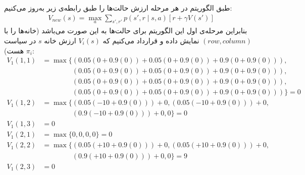 \question{}

\begin{ابجد}
\item طبق الگوریتم  در هر مرحله ارزش حالت‌ها را طبق رابطه‌ی زیر به‌روز می‌کنیم:
\begin{align*}
    V_{new}(s) = \max_a \sum_{s', r'} p(s', r \mid s,a) [r + \gamma V(s')]
\end{align*}
بنابراین مرحله‌ی اول این الگوریتم برای حالت‌ها به این صورت می‌باشد (خانه‌ها را با $(row, column)$ نمایش داده و قرارداد می‌کنیم که $V_i(s)$ ارزش خانه $s$ در سیاست $\pi_i$ هست):
\begin{align*}
    V_{1}(1, 1) & = \max \{ (0.05(0 + 0.9(0)) + 0.05(0 + 0.9(0)) + 0.9(0 + 0.9(0))),                    \\
                & \phantom{{}= \max \{ } (0.05(0 + 0.9(0)) + 0.05(0 + 0.9(0)) + 0.9(0 + 0.9(0))),       \\
                & \phantom{{}= \max \{ } (0.05(0 + 0.9(0)) + 0.05(0 + 0.9(0)) + 0.9(0 + 0.9(0))),       \\
                & \phantom{{}= \max \{ } (0.05(0 + 0.9(0)) + 0.05(0 + 0.9(0)) + 0.9(0 + 0.9(0))) \} = 0 \\[1em]
    V_{1}(1, 2) & = \max \{ (0.05(-10 + 0.9(0))) + 0, (0.05(-10 + 0.9(0))) + 0,                         \\
                & \phantom{{}= \max \{ } (0.9(-10 + 0.9(0))) + 0, 0 \} = 0                              \\[1em]
    V_{1}(1, 3) & = 0                                                                                   \\[1em]
    V_{1}(2, 1) & = \max \{ 0, 0, 0, 0 \} = 0                                                           \\[1em]
    V_{1}(2, 2) & = \max \{ (0.05(+10 + 0.9(0))) + 0, (0.05(+10 + 0.9(0))) + 0,                         \\
                & \phantom{{}= \max \{ } (0.9(+10 + 0.9(0))) + 0, 0 \} = 9                              \\[1em]
    V_{1}(2, 3) & = 0
\end{align*}


\end{ابجد}
